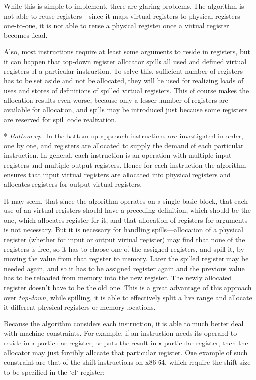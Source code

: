While this is simple to implement, there are glaring problems. The algorithm is
not able to reuse registers---since it maps virtual registers to physical
registers one-to-one, it is not able to reuse a physical register once a virtual
register becomes dead.

Also, most instructions require at least some arguments to reside in registers,
but it can happen that top-down register allocator spills all used and defined
virtual registers of a particular instruction. To solve this, sufficient number
of registers has to be set aside and not be allocated, they will be used for
realizing loads of uses and stores of definitions of spilled virtual registers.
This of course makes the allocation results even worse, because only a lesser
number of registers are available for allocation, and spills may be
introduced just because some registers are reserved for spill code realization.

* {\em Bottom-up.} In the bottom-up approach instructions are investigated in
order, one by one, and registers are allocated to supply the demand of each
particular instruction. In general, each instruction is an operation with
multiple input registers and multiple output registers. Hence for each
instruction the algorithm ensures that input virtual registers are allocated
into physical registers and allocates registers for output virtual registers.

It may seem, that since the algorithm operates on a single basic block, that each
use of an virtual registers should have a preceding definition, which should be
the one, which allocates register for it, and that allocation of registers for
arguments is not necessary. But it is necessary for handling spills---allocation
of a physical register (whether for input or output virtual register) may find
that none of the registers is free, so it has to choose one of the assigned
registers, and spill it, by moving the value from that register to memory. Later
the spilled register may be needed again, and so it has to be assigned register
again and the previous value has to be reloaded from memory into the new
register. The newly allocated register doesn't have to be the old one. This is a
great advantage of this approach over {\em top-down}, while spilling, it is able
to effectively split a live range and allocate it different physical registers
or memory locations.

Because the algorithm considers each instruction, it is able to much better deal
with machine constraints. For example, if an instruction needs its operand to
reside in a particular register, or puts the result in a particular register,
then the allocator may just forcibly allocate that particular register. One
example of such constraint are that of the shift instructions on x86-64, which
require the shift size to be specified in the `cl` register:

